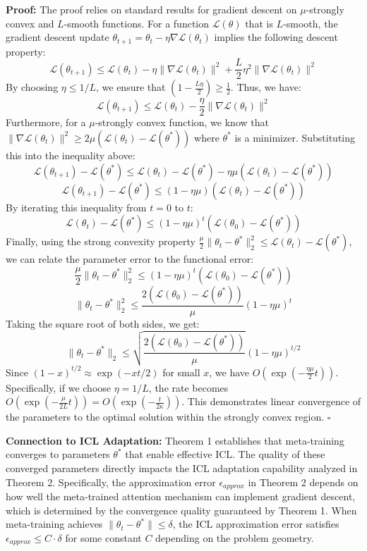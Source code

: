 \documentclass[journal]{IEEEtran}
\newenvironment{proof}{\par\medskip\noindent \textbf{Proof:} \rmfamily}{\hfill$\square$\medskip}
\begin{document}
\begin{proof}
The proof relies on standard results for gradient descent on $\mu$-strongly convex and $L$-smooth functions. For a function $\mathcal{L}(\theta)$ that is $L$-smooth, the gradient descent update $\theta_{t+1} = \theta_t - \eta \nabla \mathcal{L}(\theta_t)$ implies the following descent property:
$$ \mathcal{L}(\theta_{t+1}) \leq \mathcal{L}(\theta_t) - \eta \|\nabla \mathcal{L}(\theta_t)\|^2 + \frac{L}{2}\eta^2 \|\nabla \mathcal{L}(\theta_t)\|^2 $$
By choosing $\eta \leq 1/L$, we ensure that $(1 - \frac{L\eta}{2}) \geq \frac{1}{2}$. Thus, we have:
$$ \mathcal{L}(\theta_{t+1}) \leq \mathcal{L}(\theta_t) - \frac{\eta}{2} \|\nabla \mathcal{L}(\theta_t)\|^2 $$
Furthermore, for a $\mu$-strongly convex function, we know that $\|\nabla \mathcal{L}(\theta_t)\|^2 \geq 2\mu (\mathcal{L}(\theta_t) - \mathcal{L}(\theta^*))$ where $\theta^*$ is a minimizer. Substituting this into the inequality above:
$$ \mathcal{L}(\theta_{t+1}) - \mathcal{L}(\theta^*) \leq \mathcal{L}(\theta_t) - \mathcal{L}(\theta^*) - \eta\mu (\mathcal{L}(\theta_t) - \mathcal{L}(\theta^*)) $$
$$ \mathcal{L}(\theta_{t+1}) - \mathcal{L}(\theta^*) \leq (1-\eta\mu)(\mathcal{L}(\theta_t) - \mathcal{L}(\theta^*)) $$
By iterating this inequality from $t=0$ to $t$:
$$ \mathcal{L}(\theta_t) - \mathcal{L}(\theta^*) \leq (1-\eta\mu)^t (\mathcal{L}(\theta_0) - \mathcal{L}(\theta^*)) $$
Finally, using the strong convexity property $\frac{\mu}{2}\|\theta_t - \theta^*\|_2^2 \leq \mathcal{L}(\theta_t) - \mathcal{L}(\theta^*)$, we can relate the parameter error to the functional error:
$$ \frac{\mu}{2}\|\theta_t - \theta^*\|_2^2 \leq (1-\eta\mu)^t (\mathcal{L}(\theta_0) - \mathcal{L}(\theta^*)) $$
$$ \|\theta_t - \theta^*\|_2^2 \leq \frac{2(\mathcal{L}(\theta_0) - \mathcal{L}(\theta^*))}{\mu} (1-\eta\mu)^t $$
Taking the square root of both sides, we get:
$$ \|\theta_t - \theta^*\|_2 \leq \sqrt{\frac{2(\mathcal{L}(\theta_0) - \mathcal{L}(\theta^*))}{\mu}} (1-\eta\mu)^{t/2} $$
Since $(1-x)^{t/2} \approx \exp(-xt/2)$ for small $x$, we have $O(\exp(-\frac{\eta\mu}{2}t))$.
Specifically, if we choose $\eta = 1/L$, the rate becomes $O(\exp(-\frac{\mu}{2L}t)) = O(\exp(-\frac{t}{2\kappa}))$. This demonstrates linear convergence of the parameters to the optimal solution within the strongly convex region.
\end{proof}

\textbf{Connection to ICL Adaptation:} Theorem 1 establishes that meta-training converges to parameters $\theta^*$ that enable effective ICL. The quality of these converged parameters directly impacts the ICL adaptation capability analyzed in Theorem 2. Specifically, the approximation error $\epsilon_{approx}$ in Theorem 2 depends on how well the meta-trained attention mechanism can implement gradient descent, which is determined by the convergence quality guaranteed by Theorem 1. When meta-training achieves $\|\theta_t - \theta^*\| \leq \delta$, the ICL approximation error satisfies $\epsilon_{approx} \leq C \cdot \delta$ for some constant $C$ depending on the problem geometry.
\end{document}
